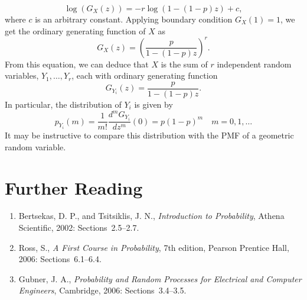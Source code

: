 \begin{example}
\begin{equation*}
\log \left( G_X(z) \right) = - r \log \left( 1 - (1-p) z \right) + c ,
\end{equation*}
where $c$ is an arbitrary constant.
Applying boundary condition $G_X(1) = 1$, we get the ordinary generating function of $X$ as
\begin{equation*}
G_X(z) = \left( \frac{p}{1 - (1-p) z} \right)^r .
\end{equation*}
From this equation, we can deduce that $X$ is the sum of $r$ independent random variables, $Y_1, \ldots, Y_r$, each with ordinary generating function
\begin{equation*}
G_{Y_i}(z) = \frac{p}{1 - (1-p) z} .
\end{equation*}
In particular, the distribution of $Y_i$ is given by
\begin{equation*}
p_{Y_i} (m) = \frac{1}{m!} \frac{d^m G_{Y_i}}{dz^m} (0) = p (1-p)^m
\quad m = 0, 1, \ldots
\end{equation*}
It may be instructive to compare this distribution with the PMF of a geometric random variable.
\end{example}


\section*{Further Reading}

\begin{small}
\begin{enumerate}
\item Bertsekas, D. P., and Tsitsiklis, J. N., \emph{Introduction to Probability}, Athena Scientific, 2002: Sections~2.5--2.7.
\item Ross, S., \emph{A First Course in Probability}, 7th edition, Pearson Prentice Hall, 2006: Sections~6.1--6.4.
\item Gubner, J. A., \emph{Probability and Random Processes for Electrical and Computer Engineers}, Cambridge, 2006: Sections~3.4--3.5.
\end{enumerate}
\end{small}

